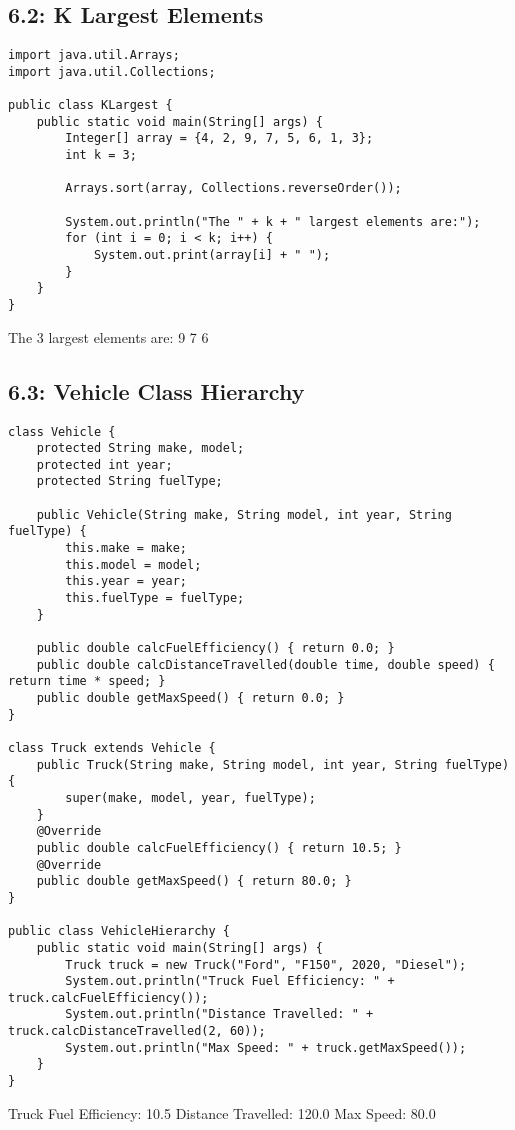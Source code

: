 \documentclass[a4paper,12pt]{article}
\begin{document}
\subsection{6.2: K Largest Elements}
\begin{samepage}
\begin{lstlisting}[caption={KLargest.java}]
import java.util.Arrays;
import java.util.Collections;

public class KLargest {
    public static void main(String[] args) {
        Integer[] array = {4, 2, 9, 7, 5, 6, 1, 3};
        int k = 3;
        
        Arrays.sort(array, Collections.reverseOrder());
        
        System.out.println("The " + k + " largest elements are:");
        for (int i = 0; i < k; i++) {
            System.out.print(array[i] + " ");
        }
    }
}
\end{lstlisting}

\begin{outputlisting}
The 3 largest elements are:
9 7 6 
\end{outputlisting}
\end{samepage}

\clearpage
\subsection{6.3: Vehicle Class Hierarchy}
\begin{samepage}
\begin{lstlisting}[caption={VehicleHierarchy.java}]
class Vehicle {
    protected String make, model;
    protected int year;
    protected String fuelType;
    
    public Vehicle(String make, String model, int year, String fuelType) {
        this.make = make;
        this.model = model;
        this.year = year;
        this.fuelType = fuelType;
    }
    
    public double calcFuelEfficiency() { return 0.0; }
    public double calcDistanceTravelled(double time, double speed) { return time * speed; }
    public double getMaxSpeed() { return 0.0; }
}

class Truck extends Vehicle {
    public Truck(String make, String model, int year, String fuelType) {
        super(make, model, year, fuelType);
    }
    @Override
    public double calcFuelEfficiency() { return 10.5; }
    @Override
    public double getMaxSpeed() { return 80.0; }
}

public class VehicleHierarchy {
    public static void main(String[] args) {
        Truck truck = new Truck("Ford", "F150", 2020, "Diesel");
        System.out.println("Truck Fuel Efficiency: " + truck.calcFuelEfficiency());
        System.out.println("Distance Travelled: " + truck.calcDistanceTravelled(2, 60));
        System.out.println("Max Speed: " + truck.getMaxSpeed());
    }
}
\end{lstlisting}

\begin{outputlisting}
Truck Fuel Efficiency: 10.5
Distance Travelled: 120.0
Max Speed: 80.0
\end{outputlisting}
\end{samepage}
\end{document}
